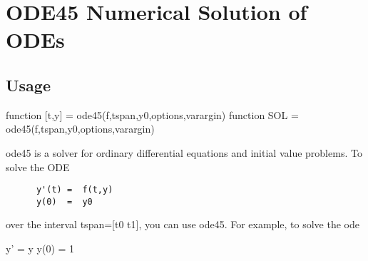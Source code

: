 \section{ODE45 Numerical Solution of ODEs}

\subsection{Usage}

 function [t,y] = ode45(f,tspan,y0,options,varargin)
 function SOL   = ode45(f,tspan,y0,options,varargin)

 ode45 is a solver for ordinary differential equations and initial value problems.
 To solve the ODE
\begin{verbatim}
      y'(t) =  f(t,y)
      y(0)  =  y0
\end{verbatim}
 over the interval tspan=[t0 t1], you can use ode45. For example, to solve
 the ode

      y'   =  y
      y(0) =  1

